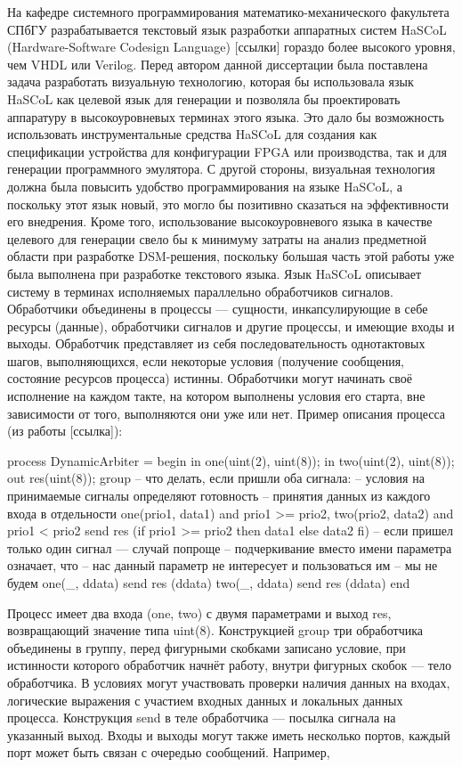 	На кафедре системного программирования математико-механического факультета СПбГУ разрабатывается текстовый язык разработки аппаратных систем HaSCoL (Hardware-Software Codesign Language) [ссылки] гораздо более высокого уровня, чем VHDL или Verilog. Перед автором данной диссертации была поставлена задача разработать визуальную технологию, которая бы использовала язык HaSCoL как целевой язык для генерации и позволяла бы проектировать аппаратуру в высокоуровневых терминах этого языка. Это дало бы возможность использовать инструментальные средства HaSCoL для создания как спецификации устройства для конфигурации FPGA или производства, так и для генерации программного эмулятора. С другой стороны, визуальная технология должна была повысить удобство программирования на языке HaSCoL, а поскольку этот язык новый, это могло бы позитивно сказаться на эффективности его внедрения. Кроме того, использование высокоуровневого языка в качестве целевого для генерации свело бы к минимуму затраты на анализ предметной области при разработке DSM-решения, поскольку большая часть этой работы уже была выполнена при разработке текстового языка.
	Язык HaSCoL описывает систему  в терминах исполняемых параллельно обработчиков сигналов. Обработчики объединены в процессы --- сущности, инкапсулирующие в себе ресурсы (данные), обработчики сигналов и другие процессы, и имеющие входы и выходы. Обработчик представляет из себя последовательность однотактовых шагов, выполняющихся, если некоторые условия (получение сообщения, состояние ресурсов процесса) истинны. Обработчики могут начинать своё исполнение на каждом такте, на котором выполнены условия его старта, вне зависимости от того, выполняются они уже или нет. Пример описания процесса (из работы [ссылка]):

process DynamicArbiter =
begin
  in one(uint(2), uint(8));
  in two(uint(2), uint(8));
  out res(uint(8));
  group {
    -- что делать, если пришли оба сигнала:
    -- условия на принимаемые сигналы определяют готовность
    -- принятия данных из каждого входа в отдельности
    one(prio1, data1) and prio1 >= prio2,
    two(prio2, data2) and prio1 < prio2
    {
      send res (if prio1 >= prio2 then data1 else data2 fi)
    }
   -- если пришел только один сигнал --- случай попроще
   -- подчеркивание вместо имени параметра означает, что
   -- нас данный параметр не интересует и пользоваться им
   -- мы не будем
    one(_, ddata) {send res (ddata)}
    two(_, ddata) {send res (ddata)}
  }
end

Процесс имеет два входа (one, two) с двумя параметрами и выход res, возвращающий значение типа uint(8). Конструкцией group три обработчика объединены в группу, перед фигурными скобками записано условие, при истинности которого обработчик начнёт работу, внутри фигурных скобок --- тело обработчика. В условиях могут участвовать проверки наличия данных на входах, логические выражения с участием входных данных и локальных данных процесса. Конструкция send в теле обработчика --- посылка сигнала на указанный выход. Входы и выходы могут также иметь несколько портов, каждый порт может быть связан с очередью сообщений. Например,

